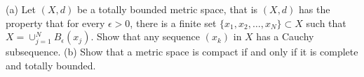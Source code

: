 (a) Let $(X,d)$ be a totally bounded metric space, that is $(X,d)$ has the property that for every $\epsilon>0$, there is a finite set $\{x_1,x_2,\ldots,x_N\}\subset X$ such that $X=\cup_{j=1}^N B_\epsilon(x_j)$. Show that any sequence $(x_k)$ in $X$ has a Cauchy subsequence. (b) Show that a metric space is compact if and only if it is complete and totally bounded.
